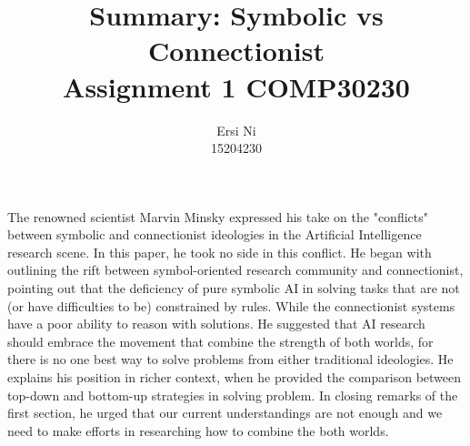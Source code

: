 \documentclass{scrartcl}
\title{Summary: Symbolic vs Connectionist \\
 \large Assignment 1 COMP30230}
\author{Ersi Ni\\
\large 15204230}
\begin{document}
\maketitle


The renowned scientist Marvin Minsky expressed his take on the "conflicts" between symbolic and connectionist ideologies in the Artificial Intelligence research scene.
In this paper, he took no side in this conflict. He began with outlining the rift between symbol-oriented research community and connectionist, pointing out that the deficiency of pure symbolic AI in solving tasks that are not (or have difficulties to be) constrained by rules. While the connectionist systems have a poor ability to reason with solutions. He suggested that AI research should embrace the movement that combine the strength of both worlds, for there is no one best way to solve problems from either traditional ideologies. He explains his position in richer context, when he provided the comparison between top-down and bottom-up strategies in solving problem. In closing remarks of the first section, he urged that our current understandings are not enough and we need to make efforts in researching how to combine the both worlds.
\end{document}
